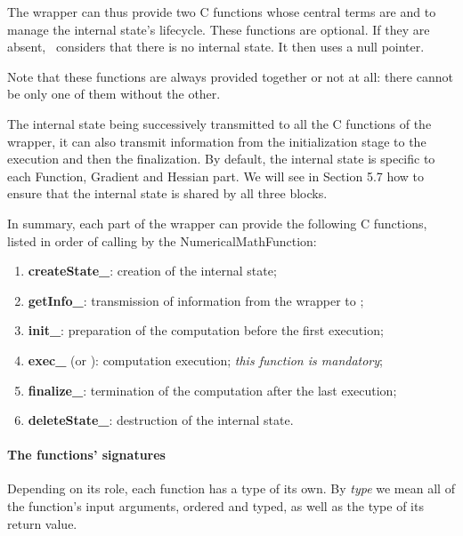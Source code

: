 The wrapper can thus provide two C functions whose central terms are  and  to manage the internal state's lifecycle. These functions are optional. If they are absent, \OT\ considers that there is no internal state. It then uses a null pointer.

Note that these functions are always provided together or not at all: there cannot be only one of them without the other.

The internal state being successively transmitted to all the C functions of the wrapper, it can also transmit information from the initialization stage to the execution and then the finalization. By default, the internal state is specific to each Function, Gradient and Hessian part. We will see in Section 5.7 how to ensure that the internal state is shared by all three blocks.

In summary, each part of the wrapper can provide the following C functions, listed in order of calling by the NumericalMathFunction:
\begin{enumerate}
\item {\bf createState\_}: creation of the internal state;
\item {\bf getInfo\_}: transmission of information from the wrapper to \OT ;
\item {\bf init\_}: preparation of the computation before the first execution;
\item {\bf exec\_} (or ): computation execution; \emph{this function is mandatory};
\item {\bf finalize\_}: termination of the computation after the last execution;
\item {\bf deleteState\_}: destruction of the internal state.
\end{enumerate}

\paragraph{The functions' signatures}

Depending on its role, each function has a type of its own. By \emph{type} we mean all of the function's input arguments, ordered and typed, as well as the type of its return value.

